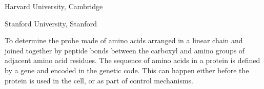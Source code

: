 \documentclass[A4,twoside,fontset=ubuntu,UTF8]{ctexart}
\begin{document}
\author{Jin-Guo Liu$^{1)}$ \quad Kai-Lai Xu$^{2)}$}

\address{1)}{Harvard University, Cambridge }
\address{2)}{Stanford University, Stanford }




\eabstract{}

\small  To determine the probe made of amino acids arranged in a linear chain and joined together by peptide bonds between the carboxyl and amino groups of adjacent amino acid residues. The sequence of amino acids in a protein is defined by a gene and encoded in the genetic code. This can happen either
before the protein is used in the cell, or as part of control mechanisms.


\end{document}
